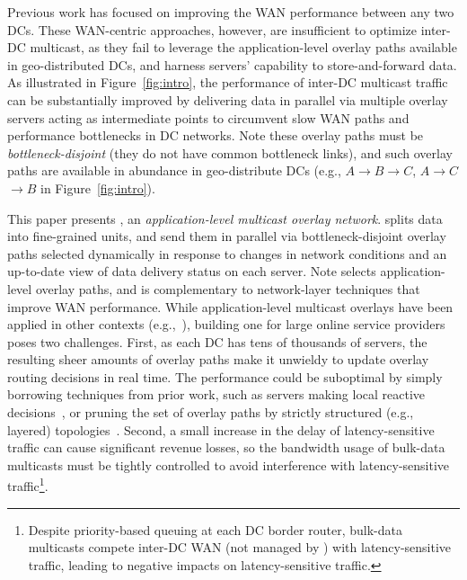 Previous work  has focused on improving the WAN performance
between any two DCs.
These WAN-centric approaches, however, are insufficient to 
optimize inter-DC multicast, as they fail to leverage
the application-level overlay paths available in 
geo-distributed DCs, and harness servers' capability to 
store-and-forward data.
As illustrated in Figure~\ref{fig:intro}, the performance of
inter-DC multicast traffic can be substantially improved by
delivering data in parallel via multiple overlay  servers
acting as intermediate points to circumvent slow WAN paths and
performance bottlenecks in DC networks.
Note these overlay paths must be {\em bottleneck-disjoint} (they do
not have common bottleneck links), and 
such overlay paths are available in abundance in
geo-distribute DCs (e.g., $A$$\rightarrow$$B$$\rightarrow$$C$,
$A$$\rightarrow$$C$$\rightarrow$$B$ in Figure~\ref{fig:intro}).




This paper presents {\em \name}, an {\em application-level
multicast overlay network}.
\name splits data into fine-grained
units, and send them in parallel via bottleneck-disjoint 
overlay paths selected dynamically in response to changes in 
network conditions and an up-to-date view
of data delivery status on each server.
Note \name selects application-level overlay paths, and is 
complementary to network-layer techniques that
improve WAN performance.
While application-level multicast overlays have been applied
in other contexts
(e.g.,~\cite{Liebeherr2002Application,Wang2007mTreebone,
Andreev2013Designing,Mokhtarian2015Minimum}), building one
for large online service providers poses two
challenges.
First, as each DC has tens of thousands of servers, the
resulting sheer amounts of overlay paths make it
unwieldy to update overlay routing decisions in real time.
The performance could be suboptimal by simply borrowing techniques
from prior work, such as servers making local reactive
decisions~\cite{kostic2003bullet,Repantis2010Scaling,Huang2014A},
or pruning the set of overlay paths by strictly
structured (e.g., layered) topologies~\cite{Nygren2010The}.
Second, a small increase in the delay of latency-sensitive traffic
can cause significant revenue losses, so the bandwidth usage
of bulk-data multicasts must be tightly controlled
to avoid interference with latency-sensitive
traffic\footnote{Despite priority-based queuing
at each DC border router, bulk-data multicasts compete
inter-DC WAN (not managed by \company) with
latency-sensitive traffic, leading to negative impacts on
latency-sensitive traffic.}.

